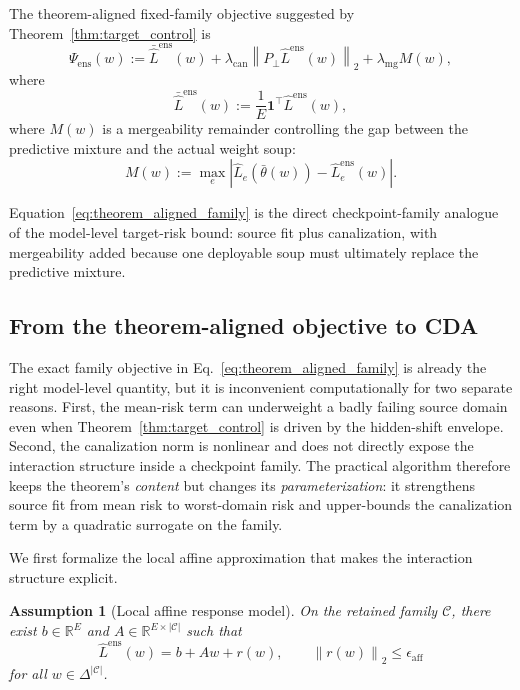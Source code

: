 \documentclass{article}
\newtheorem{assumption}[theorem]{Assumption}
\theoremstyle{definition}
\newcommand{\RR}{\mathbb{R}}
\newcommand{\cC}{\mathcal{C}}
\newcommand{\cda}{\textup{\textsc{CDA}}}
\newcommand{\one}{\mathbf{1}}
\newcommand{\simplex}{\Delta}
\newcommand{\norm}[1]{\left\lVert #1 \right\rVert}
\newcommand{\abs}[1]{\left\lvert #1 \right\rvert}
\newcommand{\thetaw}{\bar{\theta}(w)}
\begin{document}
The theorem-aligned fixed-family objective suggested by Theorem~\ref{thm:target_control} is
\begin{equation}
\Psi_{\mathrm{ens}}(w)
:=
\bar{\widehat L}^{\mathrm{ens}}(w)
+ \lambda_{\mathrm{can}}\norm{P_\perp \widehat L^{\mathrm{ens}}(w)}_2
+ \lambda_{\mathrm{mg}} M(w),
\label{eq:theorem_aligned_family}
\end{equation}
where
\[
\bar{\widehat L}^{\mathrm{ens}}(w)
:=
\frac{1}{E}\one^\top \widehat L^{\mathrm{ens}}(w),
\]
where \(M(w)\) is a mergeability remainder controlling the gap between the predictive mixture and the actual weight soup:
\begin{equation}
M(w)
:=
\max_{e}
\abs{
\widehat L_e(\thetaw)-\widehat L_e^{\mathrm{ens}}(w)
}.
\label{eq:mergeability}
\end{equation}

Equation~\eqref{eq:theorem_aligned_family} is the direct checkpoint-family analogue of the model-level target-risk bound: source fit plus canalization, with mergeability added because one deployable soup must ultimately replace the predictive mixture.

\subsection{From the theorem-aligned objective to \cda{}}

The exact family objective in Eq.~\eqref{eq:theorem_aligned_family} is already the right model-level quantity, but it is inconvenient computationally for two separate reasons. First, the mean-risk term can underweight a badly failing source domain even when Theorem~\ref{thm:target_control} is driven by the hidden-shift envelope. Second, the canalization norm is nonlinear and does not directly expose the interaction structure inside a checkpoint family. The practical algorithm therefore keeps the theorem's \emph{content} but changes its \emph{parameterization}: it strengthens source fit from mean risk to worst-domain risk and upper-bounds the canalization term by a quadratic surrogate on the family.

We first formalize the local affine approximation that makes the interaction structure explicit.

\begin{assumption}[Local affine response model]
\label{ass:affine}
On the retained family \(\cC\), there exist \(b\in\RR^E\) and \(A\in\RR^{E\times |\cC|}\) such that
\[
\widehat L^{\mathrm{ens}}(w)=b+Aw+r(w),
\qquad
\norm{r(w)}_2 \le \epsilon_{\mathrm{aff}}
\]
for all \(w\in\simplex^{|\cC|}\).
\end{assumption}
\end{document}
